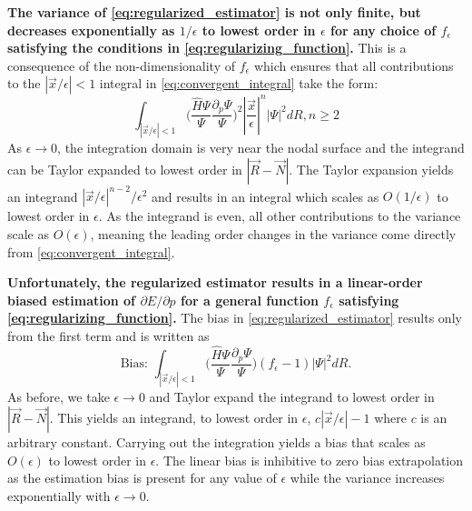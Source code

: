 \documentclass{article}
\begin{document}
\textbf{The variance of \eqref{eq:regularized_estimator} is not only finite, but decreases exponentially as $1/\epsilon$ to lowest order in $\epsilon$ for any choice of $f_\epsilon$ satisfying the conditions in \eqref{eq:regularizing_function}.}
This is a consequence of the non-dimensionality of $f_\epsilon$ which ensures that all contributions to the $|\vec{x}/\epsilon|< 1$ integral in \eqref{eq:convergent_integral} take the form:
\begin{equation}
\int_{|\vec{x}/\epsilon|< 1} \Big(\frac{\hat{H}\Psi}{\Psi}\frac{\partial_p\Psi}{\Psi}\Big)^2 |\frac{\vec{x}}{\epsilon}|^n |\Psi|^2 dR, n\geq 2
\end{equation}
As $\epsilon \rightarrow 0$, the integration domain is very near the nodal surface and the integrand can be Taylor expanded to lowest order in $|\vec{R}-\vec{N}|$. 
The Taylor expansion yields an integrand $|\vec{x}/\epsilon|^{n-2}/\epsilon^2$ and results in an integral which scales as $O(1/\epsilon)$ to lowest order in $\epsilon$.
As the integrand is even, all other contributions to the variance scale as $O(\epsilon)$, meaning the leading order changes in the variance come directly from \eqref{eq:convergent_integral}.

\textbf{Unfortunately, the regularized estimator results in a linear-order biased estimation of $\partial E/\partial p$ for a general function $f_\epsilon$ satisfying \eqref{eq:regularizing_function}.}
The bias in \eqref{eq:regularized_estimator} results only from the first term and is written as 
\begin{equation}
\text{Bias: } \int_{|\vec{x}/\epsilon|< 1} \Big(\frac{\hat{H}\Psi}{\Psi}\frac{\partial_p\Psi}{\Psi}\Big) (f_\epsilon - 1)|\Psi|^2 dR.
\label{eq:estimator_bias}
\end{equation}
As before, we take $\epsilon \rightarrow 0$ and Taylor expand the integrand to lowest order in $|\vec{R}-\vec{N}|$.
This yields an integrand, to lowest order in $\epsilon$, $c|\vec{x}/\epsilon| - 1$ where $c$ is an arbitrary constant.
Carrying out the integration yields a bias that scales as $O(\epsilon)$ to lowest order in $\epsilon$.
The linear bias is inhibitive to zero bias extrapolation as the estimation bias is present for any value of $\epsilon$ while the variance increases exponentially with $\epsilon \rightarrow 0$.
\end{document}
